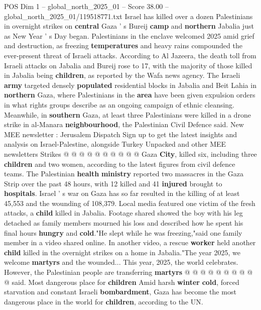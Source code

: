\begin{textsample}{POS Dim 1 – global\_north\_2025\_01 – Score 38.00 – global\_north\_2025\_01/119518771.txt}  \label{ex:f1_pos_362}
Israel has killed over a dozen Palestinians in overnight strikes on \textbf{central} Gaza ' s Bureij \textbf{camp} and \textbf{northern} Jabalia just as New Year ' s Day began.
Palestinians in the enclave welcomed 2025 amid grief and destruction, as freezing \textbf{temperatures} and heavy rains compounded the ever-present threat of Israeli attacks.
According to Al Jazeera, the death toll from Israeli attacks on Jabalia and Bureij rose to 17, with the majority of those killed in Jabalia being \textbf{children}, as reported by the Wafa news agency.
The Israeli \textbf{army} targeted densely \textbf{populated} residential blocks in Jabalia and Beit Lahia in \textbf{northern} Gaza, where Palestinians in the \textbf{area} have been given expulsion orders in what rights groups describe as an ongoing campaign of ethnic cleansing.
Meanwhile, in \textbf{southern} Gaza, at least three Palestinians were killed in a drone strike in al-Manara \textbf{neighbourhood}, the Palestinian Civil Defence said.
New MEE newsletter : Jerusalem Dispatch Sign up to get the latest insights and analysis on Israel-Palestine, alongside Turkey Unpacked and other MEE newsletters Strikes @ @ @ @ @ @ @ @ @ @ Gaza \textbf{City}, killed six, including three \textbf{children} and two women, according to the latest figures from civil defence teams.
The Palestinian \textbf{health} \textbf{ministry} reported two massacres in the Gaza Strip over the past 48 hours, with 12 killed and 41 \textbf{injured} brought to \textbf{hospitals}.
Israel ' s war on Gaza has so far resulted in the killing of at least 45,553 and the wounding of 108,379.
Local media featured one victim of the fresh attacks, a \textbf{child} killed in Jabalia.
Footage shared showed the boy with his leg detached as family members mourned his loss and described how he spent his final hours \textbf{hungry} and \textbf{cold}."He slept while he was freezing,"said one family member in a video shared online.
In another video, a rescue \textbf{worker} held another \textbf{child} killed in the overnight strikes on a home in Jabalia."The year 2025, we welcome \textbf{martyrs} and the wounded...
This year, 2025, the world celebrates.
However, the Palestinian people are transferring \textbf{martyrs} @ @ @ @ @ @ @ @ @ @ said.
Most dangerous place for \textbf{children} Amid harsh \textbf{winter} \textbf{cold}, forced starvation and constant Israeli \textbf{bombardment}, Gaza has become the most dangerous place in the world for \textbf{children}, according to the UN.

\end{textsample}

